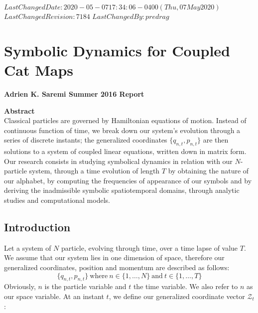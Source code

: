 {$LastChangedDate: 2020-05-07 17:34:06 -0400 (Thu, 07 May 2020) $}
{$LastChangedRevision: 7184 $} {$LastChangedBy: predrag $}

\chapter{Symbolic Dynamics for Coupled Cat Maps}
\label{chap:reportAKS}

\noindent
{\Large{\textbf{Adrien K. Saremi Summer 2016 Report}}}

\medskip

\noindent
{\large{\bf Abstract}}
\\
Classical particles are governed by Hamiltonian equations of motion.
Instead of continuous function of time, we break down our system's
evolution through a series of discrete instants; the generalized
coordinates $\{q_{n,t}, p_{n,t} \}$ are then solutions to a system of
coupled linear equations, written down in matrix form. Our research
consists in studying symbolical dynamics in relation with our
$N$-particle system, through a time evolution of length $T$ by obtaining
the nature of our alphabet, by computing the frequencies of appearance of
our symbols and by deriving the inadmissible symbolic spatiotemporal domains, through
analytic studies and computational models.

\section{Introduction}
\label{sect:introRepAKS}

Let a system of $N$ particle, evolving through time, over a time lapse of
value $T$. We assume that our system lies in one dimension of space,
therefore our generalized coordinates, position and momentum are
described as follows:
 \[
 \{q_{n,t}, p_{n,t}\} \: \text{where} \: n \in \{1, \dots, N\} \: \text{and} \: t \in \{1, \dots, T\}
 \]
Obviously, $n$ is the particle variable and $t$ the time variable. We also refer to $n$ as our space variable. At an instant $t$, we define our generalized coordinate vector $\mathcal{Z}_t$:

